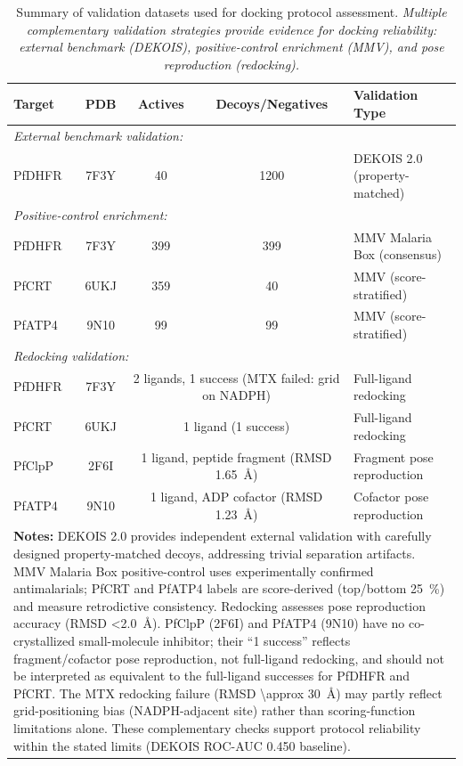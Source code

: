 
\begin{table}[!htbp]
\centering
\caption{Summary of validation datasets used for docking protocol assessment. \textit{Multiple complementary validation strategies provide evidence for docking reliability: external benchmark (DEKOIS), positive-control enrichment (MMV), and pose reproduction (redocking).}}
\label{tab:sm_validation_datasets}
\small
\begin{tabular}{lcccp{5cm}}
\toprule
\textbf{Target} & \textbf{PDB} & \textbf{Actives} & \textbf{Decoys/Negatives} & \textbf{Validation Type} \\
\midrule
\multicolumn{5}{l}{\textit{External benchmark validation:}} \\
PfDHFR & 7F3Y & \num{40} & \num{1200} & DEKOIS 2.0 (property-matched) \\
\midrule
\multicolumn{5}{l}{\textit{Positive-control enrichment:}} \\
PfDHFR & 7F3Y & \num{399} & \num{399} & MMV Malaria Box (consensus) \\
PfCRT & 6UKJ & \num{359} & \num{40} & MMV (score-stratified) \\
PfATP4 & 9N10 & \num{99} & \num{99} & MMV (score-stratified) \\
\midrule
\multicolumn{5}{l}{\textit{Redocking validation:}} \\
PfDHFR & 7F3Y & \multicolumn{2}{c}{\num{2} ligands, \num{1} success (MTX failed: grid on NADPH)} & Full-ligand redocking \\
PfCRT & 6UKJ & \multicolumn{2}{c}{\num{1} ligand (\num{1} success)} & Full-ligand redocking \\
PfClpP & 2F6I & \multicolumn{2}{c}{1 ligand, peptide fragment (RMSD \qty{1.65}{\angstrom})} & Fragment pose reproduction \\
PfATP4 & 9N10 & \multicolumn{2}{c}{1 ligand, ADP cofactor (RMSD \qty{1.23}{\angstrom})} & Cofactor pose reproduction \\
\bottomrule
\multicolumn{5}{p{14cm}}{
\noindent\textbf{Notes:} DEKOIS 2.0 provides independent external validation with carefully designed property-matched decoys, addressing trivial separation artifacts. MMV Malaria Box positive-control uses experimentally confirmed antimalarials; PfCRT and PfATP4 labels are score-derived (top/bottom \qty{25}{\percent}) and measure retrodictive consistency. Redocking assesses pose reproduction accuracy (RMSD \qty{<2.0}{\angstrom}). PfClpP (2F6I) and PfATP4 (9N10) have no co-crystallized small-molecule inhibitor; their ``1 success'' reflects fragment/cofactor pose reproduction, not full-ligand redocking, and should not be interpreted as equivalent to the full-ligand successes for PfDHFR and PfCRT. The MTX redocking failure (RMSD \qty{\approx 30}{\angstrom}) may partly reflect grid-positioning bias (NADPH-adjacent site) rather than scoring-function limitations alone. These complementary checks support protocol reliability within the stated limits (DEKOIS ROC-AUC \num{0.450} baseline).}
\end{tabular}
\end{table}
